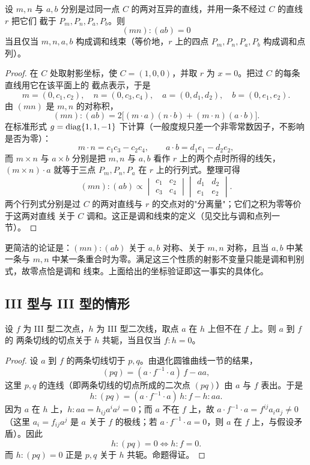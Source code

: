 \begin{proposition}
\label{prop:ii-ii-harmonic}
设 $m,n$ 与 $a,b$ 分别是过同一点 $C$ 的两对互异的直线，并用一条不经过 $C$ 的直线 $r$ 把它们
截于 $P_m,P_n,P_a,P_b$。则
\[
(mn):(ab)=0
\]
当且仅当 $m,n,a,b$ 构成调和线束（等价地，$r$ 上的四点 $P_m,P_n,P_a,P_b$ 构成调和点列）。
\end{proposition}

\begin{proof}
在 $C$ 处取射影坐标，使 $C=(1,0,0)$，并取 $r$ 为 $x=0$。把过 $C$ 的每条直线用它在该平面上的
截点表示，于是
\[
m=(0,c_1,c_2),\quad n=(0,c_3,c_4),\quad a=(0,d_1,d_2),\quad b=(0,e_1,e_2).
\]
由 $(mn)$ 是 $m,n$ 的对称积，
\[
(mn):(ab)=2\big[(m\cdot a)(n\cdot b)+(m\cdot n)(a\cdot b)\big].
\]
在标准形式 $g=\operatorname{diag}\{1,1,-1\}$ 下计算（一般度规只差一个非零常数因子，不影响是否为零）：
\[
m\cdot n=c_1c_3-c_2c_4,\qquad a\cdot b=d_1e_1-d_2e_2,
\]
而 $m\times n$ 与 $a\times b$ 分别是把 $m,n$ 与 $a,b$ 看作 $r$ 上的两个点时所得的线矢，
$(m\times n)\cdot a$ 就等于三点 $P_m,P_n,P_a$ 在 $r$ 上的行列式。整理可得
\[
(mn):(ab)\propto
\begin{vmatrix} c_1 & c_2 \\ c_3 & c_4\end{vmatrix}
\begin{vmatrix} d_1 & d_2 \\ e_1 & e_2\end{vmatrix}.
\]
两个行列式分别是过 $C$ 的两对直线与 $r$ 的交点对的"分离量"；它们之积为零等价于这两对直线
关于 $C$ 调和。这正是调和线束的定义（见交比与调和点列一节）。
\end{proof}

\begin{remark}
更简洁的论证是：$(mn):(ab)$ 关于 $a,b$ 对称、关于 $m,n$ 对称，且当 $a,b$ 中某一条与
$m,n$ 中某一条重合时为零。满足这三个性质的射影不变量只能是调和判别式，故零点恰是调和
线束。上面给出的坐标验证即这一事实的具体化。
\end{remark}

\subsection{III 型与 III 型的情形}

\begin{proposition}
\label{prop:iii-iii}
设 $f$ 为 III 型二次点，$h$ 为 III 型二次线，取点 $a$ 在 $h$ 上但不在 $f$ 上。则 $a$ 到 $f$ 的
两条切线的切点关于 $h$ 共轭，当且仅当 $f:h=0$。
\end{proposition}

\begin{proof}
设 $a$ 到 $f$ 的两条切线切于 $p,q$。由退化圆锥曲线一节的结果，
\[
(pq)=(a\cdot f^{-1}\cdot a)\,f-aa ,
\]
这里 $p,q$ 的连线（即两条切线的切点所成的二次点 $(pq)$）由 $a$ 与 $f$ 表出。于是
\[
h:(pq)=(a\cdot f^{-1}\cdot a)\,h:f-h:aa .
\]
因为 $a$ 在 $h$ 上，$h:aa=h_{ij}a^ia^j=0$；而 $a$ 不在 $f$ 上，故
$a\cdot f^{-1}\cdot a=f^{ij}a_ia_j\ne0$（这里 $a_i=f_{ij}a^j$ 是 $a$ 关于 $f$ 的极线；若
$a\cdot f^{-1}\cdot a=0$，则 $a$ 在 $f$ 上，与假设矛盾）。因此
\[
h:(pq)=0\iff h:f=0 .
\]
而 $h:(pq)=0$ 正是 $p,q$ 关于 $h$ 共轭。命题得证。
\end{proof}

